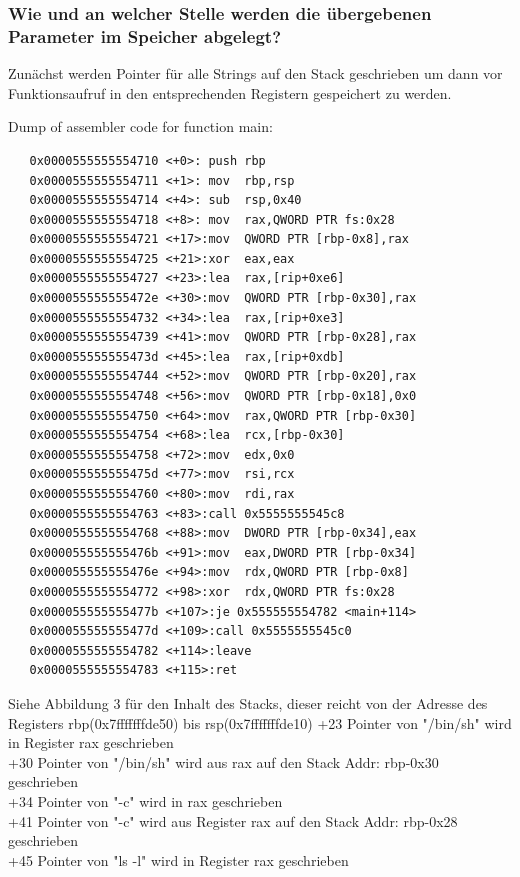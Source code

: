 \documentclass[12pt]{article}
\begin{document}
\subsubsection{Wie und an welcher Stelle werden die übergebenen Parameter im Speicher abgelegt?}

Zunächst werden Pointer für alle Strings auf den Stack geschrieben um dann vor Funktionsaufruf in den entsprechenden Registern gespeichert zu werden.

Dump of assembler code for function main:
\begin{lstlisting}
   0x0000555555554710 <+0>:	push rbp
   0x0000555555554711 <+1>:	mov  rbp,rsp
   0x0000555555554714 <+4>:	sub  rsp,0x40
   0x0000555555554718 <+8>:	mov  rax,QWORD PTR fs:0x28
   0x0000555555554721 <+17>:mov  QWORD PTR [rbp-0x8],rax
   0x0000555555554725 <+21>:xor  eax,eax
   0x0000555555554727 <+23>:lea  rax,[rip+0xe6]
   0x000055555555472e <+30>:mov  QWORD PTR [rbp-0x30],rax
   0x0000555555554732 <+34>:lea  rax,[rip+0xe3]
   0x0000555555554739 <+41>:mov  QWORD PTR [rbp-0x28],rax
   0x000055555555473d <+45>:lea  rax,[rip+0xdb]
   0x0000555555554744 <+52>:mov  QWORD PTR [rbp-0x20],rax
   0x0000555555554748 <+56>:mov  QWORD PTR [rbp-0x18],0x0
   0x0000555555554750 <+64>:mov  rax,QWORD PTR [rbp-0x30]
   0x0000555555554754 <+68>:lea  rcx,[rbp-0x30]
   0x0000555555554758 <+72>:mov  edx,0x0
   0x000055555555475d <+77>:mov  rsi,rcx
   0x0000555555554760 <+80>:mov  rdi,rax
   0x0000555555554763 <+83>:call 0x5555555545c8
   0x0000555555554768 <+88>:mov  DWORD PTR [rbp-0x34],eax
   0x000055555555476b <+91>:mov  eax,DWORD PTR [rbp-0x34]
   0x000055555555476e <+94>:mov  rdx,QWORD PTR [rbp-0x8]
   0x0000555555554772 <+98>:xor  rdx,QWORD PTR fs:0x28
   0x000055555555477b <+107>:je 0x555555554782 <main+114>
   0x000055555555477d <+109>:call 0x5555555545c0
   0x0000555555554782 <+114>:leave  
   0x0000555555554783 <+115>:ret  
\end{lstlisting}
\newpage
Siehe Abbildung 3 für den Inhalt des Stacks, dieser reicht von der Adresse des Registers rbp(0x7fffffffde50) bis rsp(0x7fffffffde10)
+23 Pointer von "/bin/sh" wird in Register rax geschrieben \\
+30 Pointer von "/bin/sh" wird aus rax auf den Stack Addr: rbp-0x30 geschrieben\\
+34 Pointer von "-c" wird in rax geschrieben\\
+41 Pointer von "-c" wird aus Register rax auf den Stack Addr: rbp-0x28 geschrieben\\
+45 Pointer von "ls -l" wird in Register rax geschrieben\\
\end{document}
